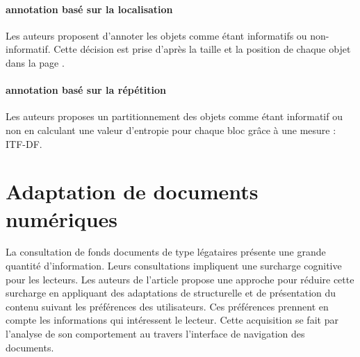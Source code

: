 \documentclass[10pt,a4paper]{article}
\begin{document}
\paragraph*{annotation basé sur la localisation} Les auteurs proposent d'annoter les objets comme étant informatifs ou non-informatif. Cette décision est prise d'après la taille et la position de chaque objet dans la page \cite{wininformative}. 

\paragraph*{annotation basé sur la répétition} Les auteurs proposes un partitionnement des objets comme étant informatif ou non en calculant une valeur d'entropie pour chaque bloc \cite{lin2002discovering} grâce à une mesure : ITF-DF.
\

\section{Adaptation de documents numériques}
La consultation de fonds documents de type légataires présente une grande quantité d'information. Leurs consultations impliquent une surcharge cognitive pour les lecteurs. Les auteurs de l'article \cite{zayani2010adaptation} propose une approche pour réduire cette surcharge en appliquant des adaptations de structurelle et de présentation du contenu suivant les préférences des utilisateurs. Ces préférences prennent en compte les informations qui intéressent le lecteur. Cette acquisition se fait par l'analyse de son comportement au travers l'interface de navigation des documents. 




\end{document}
